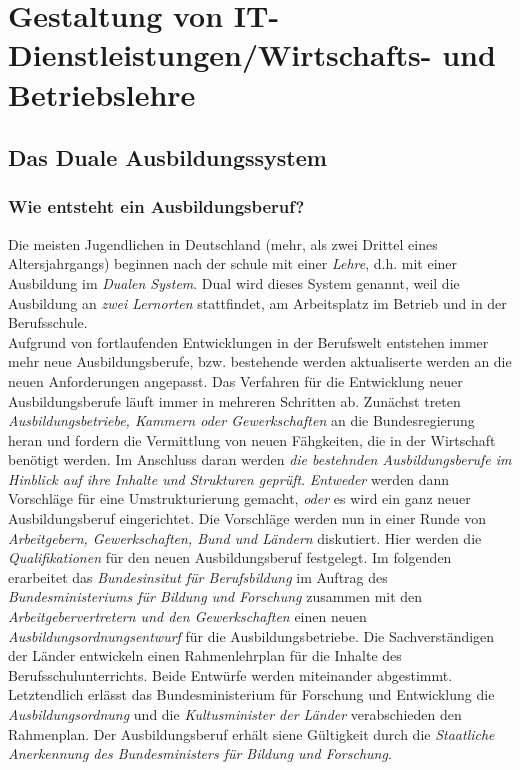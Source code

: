 \documentclass[a4paper, 12pt]{report}
\begin{document}
\chapter{Gestaltung von IT-Dienstleistungen/Wirtschafts- und Betriebslehre}

\begin{multicols}{2}
\section{Das Duale Ausbildungssystem}

\subsection{Wie entsteht ein Ausbildungsberuf?}

Die meisten Jugendlichen in Deutschland (mehr, als zwei Drittel eines
Altersjahrgangs) beginnen nach der schule mit einer \emph{Lehre}, d.h. mit
einer Ausbildung im \emph{Dualen System}. Dual wird dieses System genannt, weil
die Ausbildung an \emph{zwei Lernorten} stattfindet, am Arbeitsplatz im Betrieb
und in der Berufsschule. \\

Aufgrund von fortlaufenden Entwicklungen in der Berufswelt entstehen immer mehr
neue Ausbildungsberufe, bzw. bestehende werden aktualiserte werden an die neuen
Anforderungen angepasst. Das Verfahren für die Entwicklung neuer
Ausbildungsberufe läuft immer in mehreren Schritten ab. Zunächst treten \emph{
Ausbildungsbetriebe, Kammern oder Gewerkschaften} an die Bundesregierung heran
und fordern die Vermittlung von neuen Fähgkeiten, die in der Wirtschaft benötigt
werden. Im Anschluss daran werden \emph{die bestehnden Ausbildungsberufe im
Hinblick auf ihre Inhalte und Strukturen geprüft}. \emph{Entweder} werden dann
Vorschläge für eine Umstrukturierung gemacht, \emph{oder} es wird ein ganz neuer
Ausbildungsberuf eingerichtet. Die Vorschläge werden nun in einer Runde von
\emph{Arbeitgebern, Gewerkschaften, Bund und Ländern} diskutiert. Hier werden
die \emph{Qualifikationen} für den neuen Ausbildungsberuf festgelegt. Im
folgenden erarbeitet das \emph{Bundesinsitut für Berufsbildung} im Auftrag des
\emph{Bundesministeriums für Bildung und Forschung} zusammen mit den
\emph{Arbeitgebervertretern und den Gewerkschaften} einen neuen
\emph{Ausbildungsordnungsentwurf} für die Ausbildungsbetriebe. Die
Sachverständigen der Länder entwickeln einen Rahmenlehrplan für die Inhalte des
Berufsschulunterrichts. Beide Entwürfe werden miteinander abgestimmt.
Letztendlich erlässt das Bundesministerium für Forschung und Entwicklung die
\emph{Ausbildungsordnung} und die \emph{Kultusminister der Länder} verabschieden
den Rahmenplan. Der Ausbildungsberuf erhält siene Gültigkeit durch die
\emph{Staatliche Anerkennung des Bundesministers für Bildung und Forschung}. \\


\end{multicols}
\end{document}
